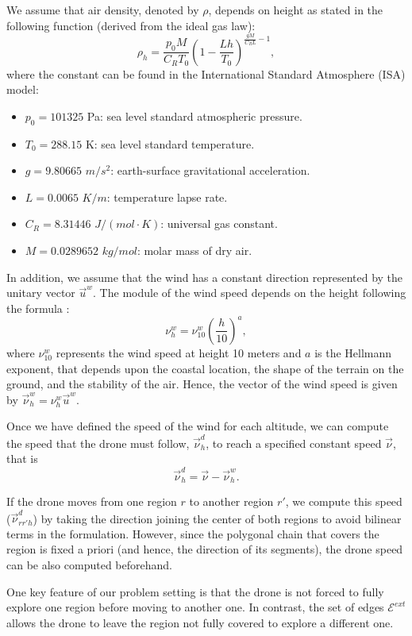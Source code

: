 \documentclass[12pt]{elsarticle}
\begin{document}
We assume that air density, denoted by $\rho$, depends on height as stated in the following function (derived from the ideal gas law):
$$
\rho_h=\frac{p_0 M}{C_RT_0}\left(1-\frac{Lh}{T_0}\right)^{\frac{gM}{C_RL}-1},
$$
where the constant can be found in the International Standard Atmosphere (ISA) model:
\begin{itemize}
    \item $p_0=101325$ Pa: sea level standard atmospheric pressure.
    \item $T_0=288.15$ K: sea level standard temperature.
    \item $g=9.80665$ $m/s^2$: earth-surface gravitational acceleration.
    \item $L=0.0065$ $K/m$: temperature lapse rate.
    \item $C_R=8.31446$ $J/(mol\cdot K)$: universal gas constant.
    \item $M=0.0289652$ $kg/mol$: molar mass of dry air.
\end{itemize}

In addition, we assume that the wind has a constant direction represented by the unitary vector $\vec{u}^w$. The module of the wind speed depends on the height following the formula \cite{heier2014grid}:
$$
\nu^w_h=\nu^w_{10}\left(\frac{h}{10}\right)^a,
$$
where $\nu^w_{10}$ represents the wind speed at height 10 meters and $a$ is the Hellmann exponent, that depends upon the coastal location, the shape of the terrain on the ground, and the stability of the air. Hence, the vector of the wind speed is given by $\vec{\nu}_h^w=\nu^w_h \vec{u}^w$.

Once we have defined the speed of the wind for each altitude, we can compute the speed that  the drone must follow, $\vec{\nu}_h^d$, to reach a specified constant speed $\vec{\nu}$, that is $$\vec{\nu}_h^d = \vec{\nu} - \vec{\nu}_h^w.$$

If the drone moves from one region $r$ to another region $r'$, we compute this speed ($\vec{\nu }_{rr'h}^d$) by taking the direction joining the center of both regions to avoid bilinear terms in the formulation. However, since the polygonal chain that covers the region is fixed a priori (and hence, the direction of its segments), the drone speed can be also computed beforehand. 

One key feature of our problem setting is that 
the drone is not forced to fully explore one region before moving to another one. In contrast, the set of edges $\mathcal E^{ext}$ allows the drone to leave the region not fully covered to explore a different one. 
\end{document}
